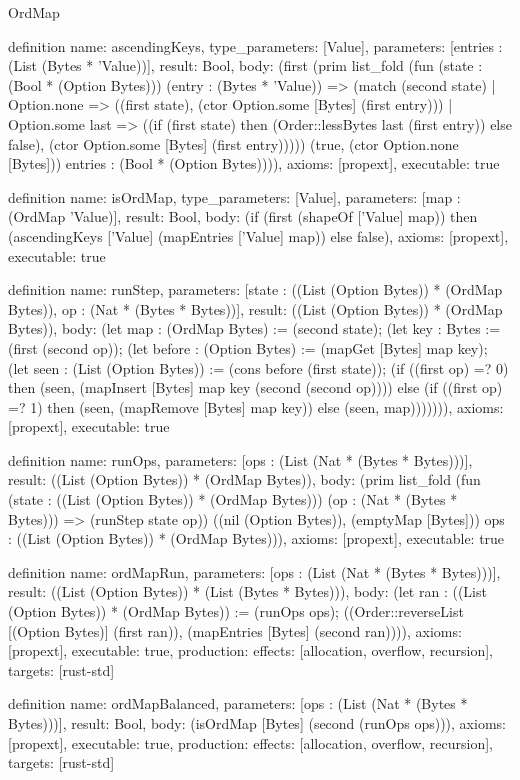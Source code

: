 \begin{lexlean}{OrdMap}
\begin{semanticmodule}
definition{
  name: ascendingKeys,
  type_parameters: [Value],
  parameters: [entries : (List (Bytes * 'Value))],
  result: Bool,
  body: (first (prim list_fold (fun (state : (Bool * (Option Bytes))) (entry : (Bytes * 'Value)) => (match (second state)
    | Option.none => ((first state), (ctor Option.some [Bytes] (first entry)))
    | Option.some last => ((if (first state) then (Order::lessBytes last (first entry)) else false), (ctor Option.some [Bytes] (first entry))))) (true, (ctor Option.none [Bytes])) entries : (Bool * (Option Bytes)))),
  axioms: [propext],
  executable: true
}

definition{
  name: isOrdMap,
  type_parameters: [Value],
  parameters: [map : (OrdMap 'Value)],
  result: Bool,
  body: (if (first (shapeOf ['Value] map)) then (ascendingKeys ['Value] (mapEntries ['Value] map)) else false),
  axioms: [propext],
  executable: true
}

definition{
  name: runStep,
  parameters: [state : ((List (Option Bytes)) * (OrdMap Bytes)), op : (Nat * (Bytes * Bytes))],
  result: ((List (Option Bytes)) * (OrdMap Bytes)),
  body: (let map : (OrdMap Bytes) := (second state); (let key : Bytes := (first (second op)); (let before : (Option Bytes) := (mapGet [Bytes] map key); (let seen : (List (Option Bytes)) := (cons before (first state)); (if ((first op) =? 0) then (seen, (mapInsert [Bytes] map key (second (second op)))) else (if ((first op) =? 1) then (seen, (mapRemove [Bytes] map key)) else (seen, map))))))),
  axioms: [propext],
  executable: true
}

definition{
  name: runOps,
  parameters: [ops : (List (Nat * (Bytes * Bytes)))],
  result: ((List (Option Bytes)) * (OrdMap Bytes)),
  body: (prim list_fold (fun (state : ((List (Option Bytes)) * (OrdMap Bytes))) (op : (Nat * (Bytes * Bytes))) => (runStep state op)) ((nil (Option Bytes)), (emptyMap [Bytes])) ops : ((List (Option Bytes)) * (OrdMap Bytes))),
  axioms: [propext],
  executable: true
}

definition{
  name: ordMapRun,
  parameters: [ops : (List (Nat * (Bytes * Bytes)))],
  result: ((List (Option Bytes)) * (List (Bytes * Bytes))),
  body: (let ran : ((List (Option Bytes)) * (OrdMap Bytes)) := (runOps ops); ((Order::reverseList [(Option Bytes)] (first ran)), (mapEntries [Bytes] (second ran)))),
  axioms: [propext],
  executable: true,
  production: {effects: [allocation, overflow, recursion], targets: [rust-std]}
}

definition{
  name: ordMapBalanced,
  parameters: [ops : (List (Nat * (Bytes * Bytes)))],
  result: Bool,
  body: (isOrdMap [Bytes] (second (runOps ops))),
  axioms: [propext],
  executable: true,
  production: {effects: [allocation, overflow, recursion], targets: [rust-std]}
}
\end{semanticmodule}
\end{lexlean}
